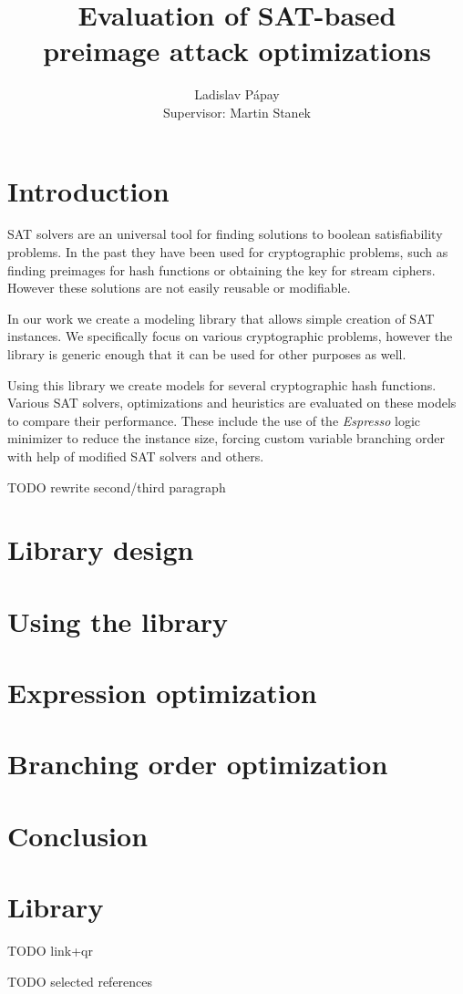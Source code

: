 \documentclass[myposter,portrait]{sciposter}
\def\mysection#1{
{\color{sectionCol}\section*{\sc\bfseries #1}}}
\begin{document}
\setlength{\logowidth}{20cm}
\setlength{\titlewidth}{\textwidth}
\addtolength{\titlewidth}{-\logowidth}
\useleftlogofalse

\color{textCol}

\title{Evaluation of SAT-based\\ preimage attack optimizations}
\author{Ladislav P\'apay\\
        Supervisor: Martin Stanek}
\maketitle

\begin{multicols*}{3}

\mysection{Introduction}
SAT solvers are an universal tool for finding solutions to boolean satisfiability problems.
In the past they have been used for cryptographic problems, such as finding preimages for hash functions or obtaining the key for stream ciphers.
However these solutions are not easily reusable or modifiable.

In our work we create a modeling library that allows simple creation of SAT instances.
We specifically focus on various cryptographic problems, however the library is generic enough that it can be used for other purposes as well.

Using this library we create models for several cryptographic hash functions.
Various SAT solvers, optimizations and heuristics are evaluated on these models to compare their performance.
These include the use of the \emph{Espresso} logic minimizer to reduce the instance size, forcing custom variable branching order with help of modified SAT solvers and others.

TODO rewrite second/third paragraph

\mysection{Library design}

\mysection{Using the library}

\mysection{Expression optimization}

\mysection{Branching order optimization}

\mysection{Conclusion}

\mysection{Library}
TODO link+qr

TODO selected references


\end{multicols*}
\end{document}
